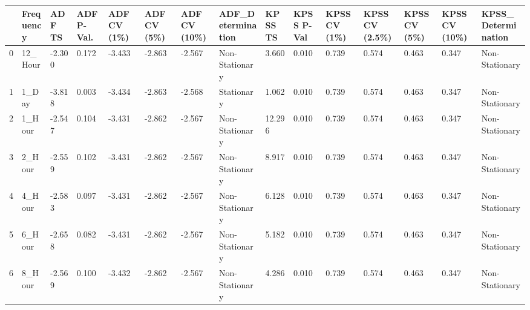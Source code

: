 \begin{tabular}{lllllllllllllll}
\toprule
 & Frequency & ADF TS & ADF P-Val. & ADF CV (1\%) & ADF CV (5\%) & ADF CV (10\%) & ADF_Determination & KPSS TS & KPSS P-Val & KPSS CV (1\%) & KPSS CV (2.5\%) & KPSS CV (5\%) & KPSS CV (10\%) & KPSS_Determination \\
\midrule
0 & 12_Hour & -2.300 & 0.172 & -3.433 & -2.863 & -2.567 & Non-Stationary & 3.660 & 0.010 & 0.739 & 0.574 & 0.463 & 0.347 & Non-Stationary \\
1 & 1_Day & -3.818 & 0.003 & -3.434 & -2.863 & -2.568 & Stationary & 1.062 & 0.010 & 0.739 & 0.574 & 0.463 & 0.347 & Non-Stationary \\
2 & 1_Hour & -2.547 & 0.104 & -3.431 & -2.862 & -2.567 & Non-Stationary & 12.296 & 0.010 & 0.739 & 0.574 & 0.463 & 0.347 & Non-Stationary \\
3 & 2_Hour & -2.559 & 0.102 & -3.431 & -2.862 & -2.567 & Non-Stationary & 8.917 & 0.010 & 0.739 & 0.574 & 0.463 & 0.347 & Non-Stationary \\
4 & 4_Hour & -2.583 & 0.097 & -3.431 & -2.862 & -2.567 & Non-Stationary & 6.128 & 0.010 & 0.739 & 0.574 & 0.463 & 0.347 & Non-Stationary \\
5 & 6_Hour & -2.658 & 0.082 & -3.431 & -2.862 & -2.567 & Non-Stationary & 5.182 & 0.010 & 0.739 & 0.574 & 0.463 & 0.347 & Non-Stationary \\
6 & 8_Hour & -2.569 & 0.100 & -3.432 & -2.862 & -2.567 & Non-Stationary & 4.286 & 0.010 & 0.739 & 0.574 & 0.463 & 0.347 & Non-Stationary \\
\bottomrule
\end{tabular}
